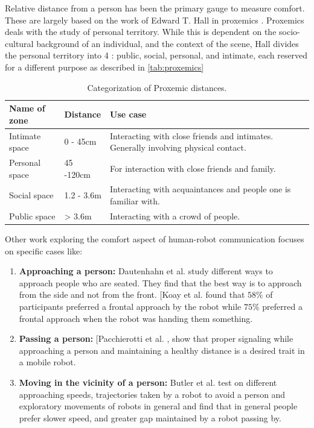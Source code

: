  Relative distance from a person has been the primary gauge to measure comfort. These are largely based on the work of Edward T. Hall in proxemics \cite{proxemics_hall_1968}. Proxemics deals with the study of personal territory. While this is dependent on the socio-cultural background of an individual, and the context of the scene, Hall divides the personal territory into 4 : public, social, personal, and intimate, each reserved for a different purpose as described in \autoref{tab:proxemics}
\begin{table}
    \begin{center}
        \renewcommand{\arraystretch}{1.3}
        \begin{tabular}{|p{}|p{}|p{}|}
            \hline
            Name of zone & Distance & Use case \\
            \hline\hline
            Intimate space & 0 - 45cm &  Interacting with close friends and intimates. Generally involving physical contact.\\
            Personal space & 45 -120cm &  For interaction with close friends and family. \\
            Social space & 1.2 - 3.6m &  Interacting with acquaintances and people one is familiar with.\\
            Public space & > 3.6m &  Interacting with a crowd of people.\\
            \hline
        \end{tabular}
        \caption{Categorization of Proxemic distances.}
        \label{tab:proxemics}
    \end{center}
\end{table}
Other work exploring the comfort aspect of human-robot communication focuses on specific cases like:
\begin{enumerate}
    \item \textbf{Approaching a person:} Dautenhahn et al. \cite{dautenhahn_2006}  study different ways to approach people who are seated. They find that the best way is to approach from the side and not from the front.
    [Koay et al. \cite{koay2007ExploratorySO}  found that $58\%$ of participants preferred a frontal approach by the robot while $75\%$ preferred a frontal approach when the robot was handing them something.
    \item \textbf{Passing a person:} [Pacchierotti et al. \cite{pacchierotti_2006} \cite{pacchierotti_2005},  show that proper signaling while approaching a person and maintaining a healthy distance is a desired trait in a mobile robot.
    \item \textbf{Moving in the vicinity of a person:}  Butler et al. \cite{butler_2001} test on different approaching speeds, trajectories taken by a robot to avoid a person and exploratory movements of robots in general and find that in general people prefer slower speed, and greater gap maintained by a robot passing by.
\end{enumerate}

